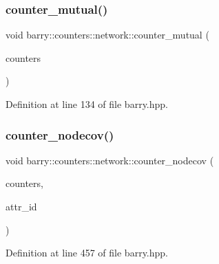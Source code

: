 \mbox{\label{namespacebarry_1_1counters_1_1network_afc4086d5788c8d5fa60ec529d9fa15dd}} 
\subsubsection{\texorpdfstring{counter\+\_\+mutual()}{counter\_mutual()}}
{\footnotesize\ttfamily void barry\+::counters\+::network\+::counter\+\_\+mutual (\begin{DoxyParamCaption}\item[{\hyperlink{namespacebarry_1_1counters_1_1network_a3b3c590303d47840d1967372ae495d95}{Net\+Counter\+Vector} $\ast$}]{counters }\end{DoxyParamCaption})\hspace{0.3cm}{\ttfamily [inline]}}



Definition at line 134 of file barry.\+hpp.

\mbox{\label{namespacebarry_1_1counters_1_1network_a7087c6419195bc768c1e8c7730757d2e}} 
\subsubsection{\texorpdfstring{counter\+\_\+nodecov()}{counter\_nodecov()}}
{\footnotesize\ttfamily void barry\+::counters\+::network\+::counter\+\_\+nodecov (\begin{DoxyParamCaption}\item[{\hyperlink{namespacebarry_1_1counters_1_1network_a3b3c590303d47840d1967372ae495d95}{Net\+Counter\+Vector} $\ast$}]{counters,  }\item[{\hyperlink{namespacebarry_a11dfc53ddb4672278319aa04f1e09a6c}{uint}}]{attr\+\_\+id }\end{DoxyParamCaption})\hspace{0.3cm}{\ttfamily [inline]}}



Definition at line 457 of file barry.\+hpp.

